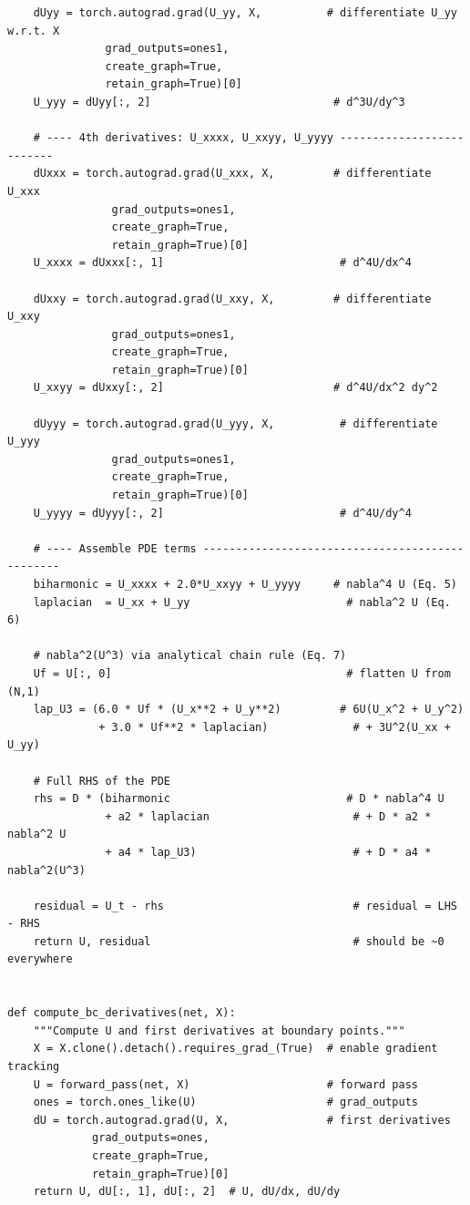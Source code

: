 \documentclass[11pt,a4paper]{article}
\begin{document}
\begin{lstlisting}
    dUyy = torch.autograd.grad(U_yy, X,          # differentiate U_yy w.r.t. X
               grad_outputs=ones1,
               create_graph=True,
               retain_graph=True)[0]
    U_yyy = dUyy[:, 2]                            # d^3U/dy^3

    # ---- 4th derivatives: U_xxxx, U_xxyy, U_yyyy --------------------------
    dUxxx = torch.autograd.grad(U_xxx, X,         # differentiate U_xxx
                grad_outputs=ones1,
                create_graph=True,
                retain_graph=True)[0]
    U_xxxx = dUxxx[:, 1]                           # d^4U/dx^4

    dUxxy = torch.autograd.grad(U_xxy, X,         # differentiate U_xxy
                grad_outputs=ones1,
                create_graph=True,
                retain_graph=True)[0]
    U_xxyy = dUxxy[:, 2]                          # d^4U/dx^2 dy^2

    dUyyy = torch.autograd.grad(U_yyy, X,          # differentiate U_yyy
                grad_outputs=ones1,
                create_graph=True,
                retain_graph=True)[0]
    U_yyyy = dUyyy[:, 2]                           # d^4U/dy^4

    # ---- Assemble PDE terms ------------------------------------------------
    biharmonic = U_xxxx + 2.0*U_xxyy + U_yyyy     # nabla^4 U (Eq. 5)
    laplacian  = U_xx + U_yy                        # nabla^2 U (Eq. 6)

    # nabla^2(U^3) via analytical chain rule (Eq. 7)
    Uf = U[:, 0]                                    # flatten U from (N,1)
    lap_U3 = (6.0 * Uf * (U_x**2 + U_y**2)         # 6U(U_x^2 + U_y^2)
              + 3.0 * Uf**2 * laplacian)             # + 3U^2(U_xx + U_yy)

    # Full RHS of the PDE
    rhs = D * (biharmonic                           # D * nabla^4 U
               + a2 * laplacian                      # + D * a2 * nabla^2 U
               + a4 * lap_U3)                        # + D * a4 * nabla^2(U^3)

    residual = U_t - rhs                             # residual = LHS - RHS
    return U, residual                               # should be ~0 everywhere


def compute_bc_derivatives(net, X):
    """Compute U and first derivatives at boundary points."""
    X = X.clone().detach().requires_grad_(True)  # enable gradient tracking
    U = forward_pass(net, X)                     # forward pass
    ones = torch.ones_like(U)                    # grad_outputs
    dU = torch.autograd.grad(U, X,               # first derivatives
             grad_outputs=ones,
             create_graph=True,
             retain_graph=True)[0]
    return U, dU[:, 1], dU[:, 2]  # U, dU/dx, dU/dy
\end{lstlisting}
\end{document}
